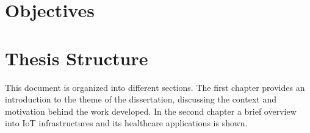 \section{Objectives}

\section{Thesis Structure}

This document is organized into different sections. The first chapter provides an introduction to the theme of the dissertation, discussing the context and motivation behind the work developed. In the second chapter a brief overview into \acs{IoT} infrastructures and its healthcare applications is shown.

